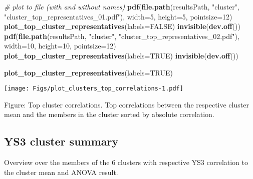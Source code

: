 \documentclass[]{article}
\newenvironment{Shaded}{\begin{snugshade}}{\end{snugshade}}
\newcommand{\KeywordTok}[1]{\textcolor[rgb]{0.13,0.29,0.53}{\textbf{{#1}}}}
\newcommand{\DataTypeTok}[1]{\textcolor[rgb]{0.13,0.29,0.53}{{#1}}}
\newcommand{\DecValTok}[1]{\textcolor[rgb]{0.00,0.00,0.81}{{#1}}}
\newcommand{\StringTok}[1]{\textcolor[rgb]{0.31,0.60,0.02}{{#1}}}
\newcommand{\CommentTok}[1]{\textcolor[rgb]{0.56,0.35,0.01}{\textit{{#1}}}}
\newcommand{\OtherTok}[1]{\textcolor[rgb]{0.56,0.35,0.01}{{#1}}}
\newcommand{\NormalTok}[1]{{#1}}
\begin{document}
\begin{Shaded}
\begin{Highlighting}[]
\CommentTok{# plot to file (with and without names)}
\KeywordTok{pdf}\NormalTok{(}\KeywordTok{file.path}\NormalTok{(resultsPath, }\StringTok{"cluster"}\NormalTok{, }\StringTok{"cluster_top_representatives_01.pdf"}\NormalTok{), }
    \DataTypeTok{width=}\DecValTok{5}\NormalTok{, }\DataTypeTok{height=}\DecValTok{5}\NormalTok{, }\DataTypeTok{pointsize=}\DecValTok{12}\NormalTok{)}
\KeywordTok{plot_top_cluster_representatives}\NormalTok{(}\DataTypeTok{labels=}\OtherTok{FALSE}\NormalTok{)}
\KeywordTok{invisible}\NormalTok{(}\KeywordTok{dev.off}\NormalTok{())}
\KeywordTok{pdf}\NormalTok{(}\KeywordTok{file.path}\NormalTok{(resultsPath, }\StringTok{"cluster"}\NormalTok{, }\StringTok{"cluster_top_representatives_02.pdf"}\NormalTok{), }
    \DataTypeTok{width=}\DecValTok{10}\NormalTok{, }\DataTypeTok{height=}\DecValTok{10}\NormalTok{, }\DataTypeTok{pointsize=}\DecValTok{12}\NormalTok{)}
\KeywordTok{plot_top_cluster_representatives}\NormalTok{(}\DataTypeTok{labels=}\OtherTok{TRUE}\NormalTok{)}
\KeywordTok{invisible}\NormalTok{(}\KeywordTok{dev.off}\NormalTok{())}
\end{Highlighting}
\end{Shaded}

\begin{Shaded}
\begin{Highlighting}[]
\KeywordTok{plot_top_cluster_representatives}\NormalTok{(}\DataTypeTok{labels=}\OtherTok{TRUE}\NormalTok{)}
\end{Highlighting}
\end{Shaded}

\texttt{[image: Figs/plot\_clusters\_top\_correlations-1.pdf]}

Figure: Top cluster correlations. Top correlations between the
respective cluster mean and the members in the cluster sorted by
absolute correlation.

\subsection{YS3 cluster summary}\label{ys3-cluster-summary}

Overview over the members of the 6 clusters with respective YS3
correlation to the cluster mean and ANOVA result.
\end{document}
